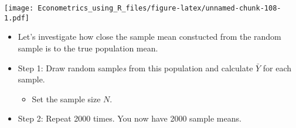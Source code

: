 \documentclass[]{book}
\providecommand{\tightlist}{%
  \setlength{\itemsep}{0pt}\setlength{\parskip}{0pt}}
\begin{document}
\texttt{[image: Econometrics\_using\_R\_files/figure-latex/unnamed-chunk-108-1.pdf]}

\begin{itemize}
\tightlist
\item
  Let's investigate how close the sample mean constucted from the random
  sample is to the true population mean.
\item
  Step 1: Draw random sample\emph{s} from this population and calculate
  \(\bar{Y}\) for each sample.

  \begin{itemize}
  \tightlist
  \item
    Set the sample size \(N\).
  \end{itemize}
\item
  Step 2: Repeat 2000 times. You now have 2000 sample means.
\end{itemize}
\end{document}
